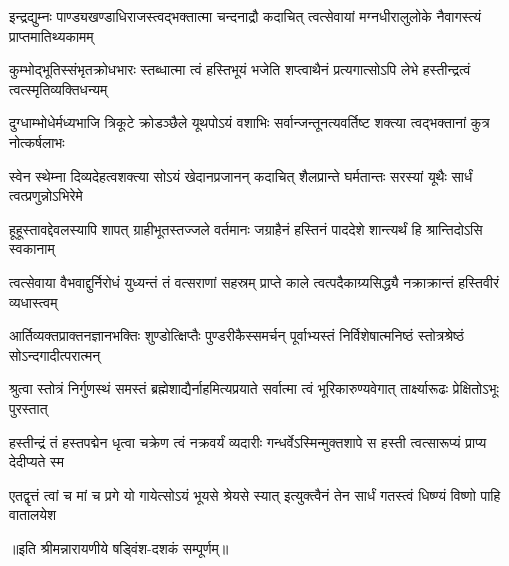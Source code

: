\begin{center}

\twolineshloka
{इन्द्रद्युम्नः पाण्ड्यखण्डाधिराजस्त्वद्भक्तात्मा चन्दनाद्रौ कदाचित्}
{त्वत्सेवायां मग्नधीरालुलोके नैवागस्त्यं प्राप्तमातिथ्यकामम्}%

\twolineshloka
{कुम्भोद्भूतिस्संभृतक्रोधभारः स्तब्धात्मा त्वं हस्तिभूयं भजेति}
{शप्{}त्वाथैनं प्रत्यगात्सोऽपि लेभे हस्तीन्द्रत्वं त्वत्स्मृतिव्यक्तिधन्यम्}%

\twolineshloka
{दुग्धाम्भोधेर्मध्यभाजि त्रिकूटे क्रोडञ्छैले यूथपोऽयं वशाभिः}
{सर्वान्जन्तूनत्यवर्तिष्ट शक्त्या त्वद्भक्तानां कुत्र नोत्कर्षलाभः}%

\twolineshloka
{स्वेन स्थेम्ना दिव्यदेहत्वशक्त्या सोऽयं खेदानप्रजानन् कदाचित्}
{शैलप्रान्ते घर्मतान्तः सरस्यां यूथैः सार्धं त्वत्प्रणुन्नोऽभिरेमे}%

\twolineshloka
{हूहूस्तावद्देवलस्यापि शापत् ग्राहीभूतस्तज्जले वर्तमानः}
{जग्राहैनं हस्तिनं पाददेशे शान्त्यर्थं हि श्रान्तिदोऽसि स्वकानाम्}%

\twolineshloka
{त्वत्सेवाया वैभवाद्दुर्निरोधं युध्यन्तं तं वत्सराणां सहस्रम्}
{प्राप्ते काले त्वत्पदैकाग्र्यसिद्ध्यै नक्राक्रान्तं हस्तिवीरं व्यधास्त्वम्}%

\twolineshloka
{आर्तिव्यक्तप्राक्तनज्ञानभक्तिः शुण्डोत्क्षिप्तैः पुण्डरीकैस्समर्चन्}
{पूर्वाभ्यस्तं निर्विशेषात्मनिष्ठं स्तोत्रश्रेष्ठं सोऽन्दगादीत्परात्मन्}%

\twolineshloka
{श्रुत्वा स्तोत्रं निर्गुणस्थं समस्तं ब्रह्मेशाद्यैर्नाहमित्यप्रयाते}
{सर्वात्मा त्वं भूरिकारुण्यवेगात् तार्क्ष्यारूढः प्रेक्षितोऽभूः पुरस्तात्}%

\twolineshloka
{हस्तीन्द्रं तं हस्तपद्मेन धृत्वा चक्रेण त्वं नक्रवर्यं व्यदारीः}
{गन्धर्वेऽस्मिन्मुक्तशापे स हस्ती त्वत्सारूप्यं प्राप्य देदीप्यते स्म}%

\twolineshloka
{एतद्{}वृत्तं त्वां च मां च प्रगे यो गायेत्सोऽयं भूयसे श्रेयसे स्यात्}
{इत्युक्त्वैनं तेन सार्धं गतस्त्वं धिष्ण्यं विष्णो पाहि वातालयेश}%

॥इति श्रीमन्नारायणीये षड्विंश-दशकं सम्पूर्णम्॥

\closesection
\clearpage


\clearpage

\closesection
\clearpage
{}



\closesection
\clearpage


\end{center}
